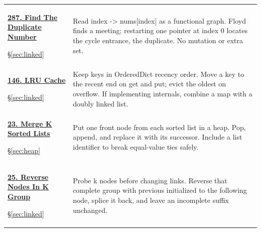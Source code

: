 \documentclass[11pt]{article}
\newcommand{\sect}[1]{\hyperref[sec:#1]{\S\ref*{sec:#1}}}
\begin{document}
\begin{longtable}{@{}L{4.3cm}L{11.7cm}@{}}
\hypertarget{lc287}{}\href{https://leetcode.com/problems/find-the-duplicate-number/}{\textbf{287. Find The Duplicate Number}}\par\sect{linked} & Read index -> nums[index] as a functional graph. Floyd finds a meeting; restarting one pointer at index 0 locates the cycle entrance, the duplicate. No mutation or extra set.\\[4pt]
\hypertarget{lc146}{}\href{https://leetcode.com/problems/lru-cache/}{\textbf{146. LRU Cache}}\par\sect{linked} & Keep keys in OrderedDict recency order. Move a key to the recent end on get and put; evict the oldest on overflow. If implementing internals, combine a map with a doubly linked list.\\[4pt]
\hypertarget{lc23}{}\href{https://leetcode.com/problems/merge-k-sorted-lists/}{\textbf{23. Merge K Sorted Lists}}\par\sect{heap} & Put one front node from each sorted list in a heap. Pop, append, and replace it with its successor. Include a list identifier to break equal-value ties safely.\\[4pt]
\hypertarget{lc25}{}\href{https://leetcode.com/problems/reverse-nodes-in-k-group/}{\textbf{25. Reverse Nodes In K Group}}\par\sect{linked} & Probe k nodes before changing links. Reverse that complete group with previous initialized to the following node, splice it back, and leave an incomplete suffix unchanged.\\[4pt]
\bottomrule
\end{longtable}
\end{document}
